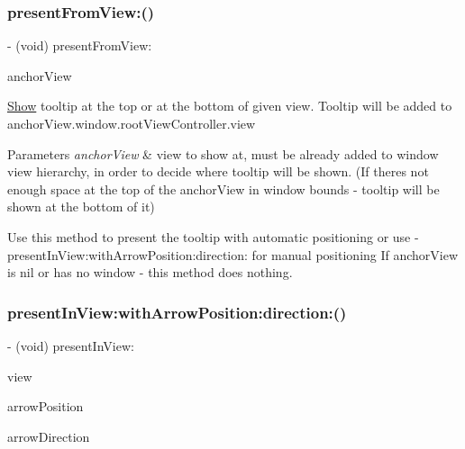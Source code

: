 \subsubsection{\texorpdfstring{present\+From\+View\+:()}{presentFromView:()}\hspace{0.1cm}{\footnotesize\ttfamily [5/5]}}
{\footnotesize\ttfamily -\/ (void) present\+From\+View\+: \begin{DoxyParamCaption}\item[{(U\+I\+View $\ast$)}]{anchor\+View }\end{DoxyParamCaption}}

\hyperlink{classShow}{Show} tooltip at the top or at the bottom of given view. Tooltip will be added to anchor\+View.\+window.\+root\+View\+Controller.\+view


\begin{DoxyParams}{Parameters}
{\em anchor\+View} & view to show at, must be already added to window view hierarchy, in order to decide where tooltip will be shown. (If there\textquotesingle{}s not enough space at the top of the anchor\+View in window bounds -\/ tooltip will be shown at the bottom of it)\\
\hline
\end{DoxyParams}
Use this method to present the tooltip with automatic positioning or use -\/present\+In\+View\+:with\+Arrow\+Position\+:direction\+: for manual positioning If anchor\+View is nil or has no window -\/ this method does nothing. \mbox{\label{interfaceFBTooltipView_ae7b47d160c23b6a26bf42018b0e3a551}} 
\subsubsection{\texorpdfstring{present\+In\+View\+:with\+Arrow\+Position\+:direction\+:()}{presentInView:withArrowPosition:direction:()}\hspace{0.1cm}{\footnotesize\ttfamily [1/5]}}
{\footnotesize\ttfamily -\/ (void) present\+In\+View\+: \begin{DoxyParamCaption}\item[{(U\+I\+View $\ast$)}]{view }\item[{withArrowPosition:(C\+G\+Point)}]{arrow\+Position }\item[{direction:(F\+B\+Tooltip\+View\+Arrow\+Direction)}]{arrow\+Direction }\end{DoxyParamCaption}}

